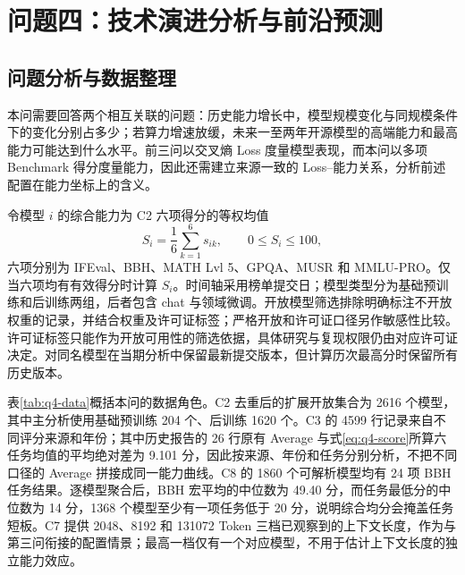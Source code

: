 \setcounter{section}{6}
\section{问题四：技术演进分析与前沿预测}
\label{sec:q4}
\setcounter{equation}{0}
\setcounter{figure}{0}
\setcounter{table}{0}

\subsection{问题分析与数据整理}

本问需要回答两个相互关联的问题：历史能力增长中，模型规模变化与同规模条件下的变化分别占多少；若算力增速放缓，未来一至两年开源模型的高端能力和最高能力可能达到什么水平。前三问以交叉熵 Loss 度量模型表现，而本问以多项 Benchmark 得分度量能力，因此还需建立来源一致的 Loss--能力关系\cite{gadre2024,observational2024}，分析前述配置在能力坐标上的含义。

令模型 $i$ 的综合能力为 C2 六项得分的等权均值
\begin{equation}
 S_i=\frac{1}{6}\sum_{k=1}^{6}s_{ik},\qquad 0\leq S_i\leq100,
 \label{eq:q4-score}
\end{equation}
六项分别为 IFEval\cite{ifeval2023}、BBH\cite{bbh2023}、MATH Lvl 5\cite{math2021}、GPQA\cite{gpqa2024}、MUSR\cite{musr2024} 和 MMLU-PRO\cite{mmlupro2024}。仅当六项均有有效得分时计算 $S_i$。时间轴采用榜单提交日；模型类型分为基础预训练和后训练两组，后者包含 chat 与领域微调。开放模型筛选排除明确标注不开放权重的记录，并结合权重及许可证标签；严格开放和许可证口径另作敏感性比较。许可证标签只能作为开放可用性的筛选依据，具体研究与复现权限仍由对应许可证决定。对同名模型在当期分析中保留最新提交版本，但计算历次最高分时保留所有历史版本。

表\ref{tab:q4-data}概括本问的数据角色。C2 去重后的扩展开放集合为 2616 个模型，其中主分析使用基础预训练 204 个、后训练 1620 个。C3 的 4599 行记录来自不同评分来源和年份；其中历史报告的 26 行原有 Average 与式\eqref{eq:q4-score}所算六任务均值的平均绝对差为 9.101 分，因此按来源、年份和任务分别分析，不把不同口径的 Average 拼接成同一能力曲线。C8 的 1860 个可解析模型均有 24 项 BBH 任务结果。逐模型聚合后，BBH 宏平均的中位数为 49.40 分，而任务最低分的中位数为 14 分，1368 个模型至少有一项任务低于 20 分，说明综合均分会掩盖任务短板。C7 提供 2048、8192 和 131072 Token 三档已观察到的上下文长度，作为与第三问衔接的配置情景；最高一档仅有一个对应模型，不用于估计上下文长度的独立能力效应。


